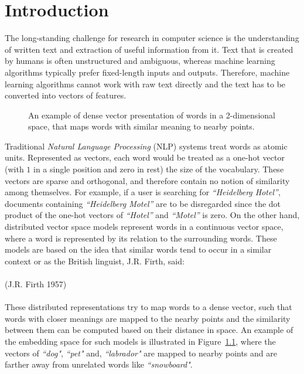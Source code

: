 \chapter{Introduction}\label{chap:intro}
The long-standing challenge for research in computer science is the understanding of written text and extraction of useful information from it. Text that is created by humans is often unstructured and ambiguous, whereas machine learning algorithms typically prefer fixed-length inputs and outputs. Therefore, machine learning algorithms cannot work with raw text directly and the text has to be converted into vectors of features.
\\
\begin{figure}
\centering 
\resizebox{0.3\textwidth}{0.25\textwidth}{      

}
\caption{An example of dense vector presentation of words in a 2-dimensional space, that maps words with similar meaning to nearby points.}
\label{fig:vsmodels}
\end{figure}
Traditional \emph{Natural Language Processing} (NLP) systems treat words as atomic units. Represented as vectors, each word would be treated as a one-hot vector (with $1$ in a single position and zero in rest) the size of the vocabulary. These vectors are sparse and orthogonal, and therefore contain no notion of similarity among themselves. For example, if a user is searching for \emph{``Heidelberg Hotel''}, documents containing \emph{``Heidelberg Motel''} are to be disregarded since the dot product of the one-hot vectors of \emph{``Hotel''} and \emph{``Motel''} is zero. On the other hand, distributed vector space models represent words in a continuous vector space, where a word is represented by its relation to the surrounding words. These models are based on the idea that similar words tend to occur in a similar context or as the British linguist, J.R. Firth, said:\\ \\
\noindent
{} (J.R. Firth 1957)\\
\\
These distributed representations try to map words to a dense vector, such that words with closer meanings are mapped to the nearby points and the similarity between them can be computed based on their distance in space. An example of the embedding space for such models is illustrated in Figure~\ref{fig:vsmodels}, where the vectors of \emph{``dog"},  \emph{``pet"} and, \emph{``labrador"} are mapped to nearby points and are farther away from unrelated words like \emph{``snowboard"}.
